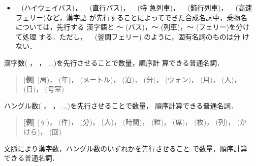 \begin{description}
\begin{itemize}
\begin{enumerate}
    \item 分け前，分量 の 
 : <名詞形接尾辞>\\{}
    {\bf [例]} 
\ 
\ 
.
              (サムゲタン二人前ください．)
    \end{enumerate}
    
    \item {}
\ 
(ハイウェイバス)，
\ 
(直行バス)，
\ 
(特
    急列車)，
\ 
(鈍行列車)，
\ 
(高速フェリー)など，漢字語
    が先行することによってできた合成名詞中，乗物名については，先行する
    漢字語と 〜
(バス)，〜
(列車)，〜
(フェリー)を分けて処理
    する．ただし，
\ 
(釜関フェリー) のように，固有名詞のものは分
    けない．

\end{itemize}



\item[{[漢字数]}] 漢字数(
，
，
...)を先行させることで数量，順序計
算できる普通名詞． 

\begin{quote}
{\bf [例]}
(局)，
(年)，
(メートル)，
(泊)，
(分)，
(ウォン)，
(月)，
(人)，
(日)，
(号室)
\end{quote}
        
\item[{[ハングル数]}]ハングル数(
，
，
...)を先行させることで数量，
順序計算できる普通名詞．
        
\begin{quote}
{\bf [例]} 
(ヶ)，
(件)，
(分)，
(人)，
(時間)，
(粒)，
(席)，
(枚)，
(列)，
(かけら)，
(回)
\end{quote}

        
\item[{[選択]}]文脈により漢字数，ハングル数のいずれかを先行させること
で数量，順序計算できる普通名詞． 


\end{description}
